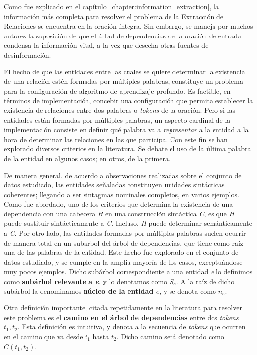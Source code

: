 Como fue explicado en el capítulo~\ref{chapter:information_extraction}, la información más completa para resolver el problema de la Extracción de Relaciones se encuentra en la oración íntegra. Sin embargo, se maneja por muchos autores la suposición de que el árbol de dependencias de la oración de entrada condensa la información vital, a la vez que desecha otras fuentes de desinformación.

El hecho de que las entidades entre las cuales se quiere determinar la existencia de una relación estén formadas por múltiples palabras, constituye un problema para la configuración de algoritmo de aprendizaje profundo.
Es factible, en términos de implementación, concebir una configuración que permita establecer la existencia de relaciones entre dos palabras o \textit{tokens} de la oración.
Pero si las entidades están formadas por múltiples palabras, un aspecto cardinal de la implementación consiste en definir qué palabra va a \textit{representar} a la entidad a la hora de determinar las relaciones en las que participa.
Con este fin se han explorado diversos criterios en la literatura.
Se debate el uso de la última palabra de la entidad en algunos casos; en otros, de la primera.

De manera general, de acuerdo a observaciones realizadas sobre el conjunto de datos estudiado, las entidades señaladas constituyen unidades sintácticas coherentes; llegando a ser sintagmas nominales completos, en varios ejemplos.
Como fue abordado, uno de los criterios que determina la existencia de una dependencia con una cabecera \textit{H} en una construcción sintáctica \textit{C}, es que \textit{H} puede sustituir sintácticamente a \textit{C}.
Incluso, \textit{H} puede determinar semánticamente a \textit{C}.
Por otro lado, las entidades formadas por múltiples palabras suelen ocurrir de manera total en un subárbol del árbol de dependencias, que tiene como raíz una de las palabras de la entidad.
Este hecho fue explorado en el conjunto de datos estudiado, y se cumple en la amplia mayoría de los casos, exceptuándose muy pocos ejemplos.
Dicho subárbol correspondiente a una entidad \textit{e} lo definimos como \textbf{subárbol relevante a \textit{e}}, y lo denotamos como $S_e$.
A la raíz de dicho subárbol la denominamos \textbf{núcleo de la entidad $e$}, y se denota como $n_e$.

Otra definición importante, citada repetidamente en la literatura para resolver este problema es el \textbf{camino en el árbol de dependencias} entre dos \textit{tokens} $t_1,t_2$.
Esta definición es intuitiva, y denota a la secuencia de \textit{tokens} que ocurren en el camino que va desde $t_1$ hasta $t_2$.
Dicho camino será denotado como $C(t_1,t_2)$.

